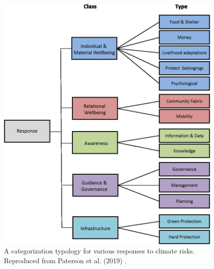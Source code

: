 \begin{figure}
    \centering
    \includegraphics[width=\columnwidth]{figures/02_literature_review/risk-response.png}
    \caption{A categorization typology for various responses to climate risks.
    Reproduced from Paterson et al. (2019)
    \cite{paterson_community-based_2019}.}
    \label{fig:risk-response}
\end{figure}


